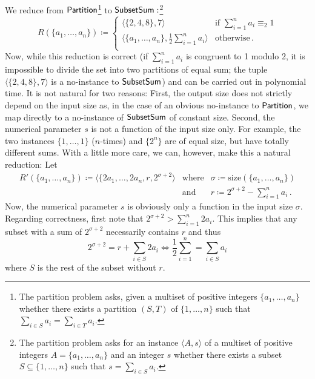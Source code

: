 \documentclass[11pt]{article}
\begin{document}
\begin{example}
  We reduce from
  $\mathsf{Partition}$\footnote{The partition problem asks, given a multiset
  of positive integers $\{a_1, \dots, a_n\}$ whether there exists a partition
  $(S,T)$ of $\{1, \dots, n\}$ such that
  $\sum_{i \in S} a_i = \sum_{i \in T} a_i$.}
  to
  $\mathsf{SubsetSum}:$\footnote{The partition problem asks for an instance
  $\langle A, s \rangle$ of a multiset of positive integers
  $A = \{a_1, \dots, a_n\}$ and an integer $s$ whether there exists a subset
  $S \subseteq \{1, \dots, n\}$ such that
  $s = \sum_{i \in S} a_i$.}
  \[
    R(\{a_1, \dots, a_n\}) \coloneqq
    \left\{
      \begin{array}{ll}
        \langle \{2, 4, 8\}, 7 \rangle
          & \textrm{if } \sum_{i=1}^n a_i \equiv_2 1 \\
        \langle \{a_1, \dots, a_n\}, \frac 1 2 \sum_{i=1}^n a_i \rangle
          & \textrm{otherwise} \,. \\
      \end{array}
    \right.
  \]
  Now, while this reduction is correct (if $\sum_{i=1}^n a_i$ is congruent to 1
  modulo 2, it is impossible to divide the set into two partitions of equal sum;
  the tuple $\langle \{2, 4, 8\}, 7 \rangle$ is a no-instance to
  $\mathsf{SubsetSum}$) and can be carried out in polynomial time.
  It is not natural for two reasons:
  First, the output size does not strictly depend on the input size as, in the
  case of an obvious no-instance to $\mathsf{Partition}$, we map directly to a
  no-instance of $\mathsf{SubsetSum}$ of constant size.
  Second, the numerical parameter $s$ is not a function of the input
  size only. For example, the two instances $\{1, \dots, 1\}$ ($n$-times) and
  $\{2^n\}$ are of equal size, but have totally different sums.
  With a little more care, we can, however, make this a natural reduction: Let
  \[
    \begin{array}{rrl}
      R'(\{a_1, \dots, a_n\}) \coloneqq
        \langle \{2 a_1, \dots, 2 a_n, r,
         2^{\sigma+2} \rangle
      &\textrm{where}&
      \sigma \coloneqq \mathrm{size}(\{a_1, \dots, a_n\}) \\
      &\textrm{and}&
      r \coloneqq 2^{\sigma+2} - \sum_{i=1}^n a_i \,.
    \end{array}
  \]
  Now, the numerical parameter $s$ is obviously only a function in the input
  size $\sigma$. Regarding correctness, first note that
  $2^{\sigma+2} > \sum_{i=1}^n 2 a_i$. This implies that any subset with a sum
  of $2^{\sigma+2}$ necessarily contains $r$ and thus
  \[
    \textstyle
    2^{\sigma+2} = r + \sum_{i \in S} 2a_i
    \iff
    \frac 1 2 \sum_{i=1}^n = \sum_{i \in S} a_i
  \]
  where $S$ is the rest of the subset without $r$.
\end{example}
\end{document}
